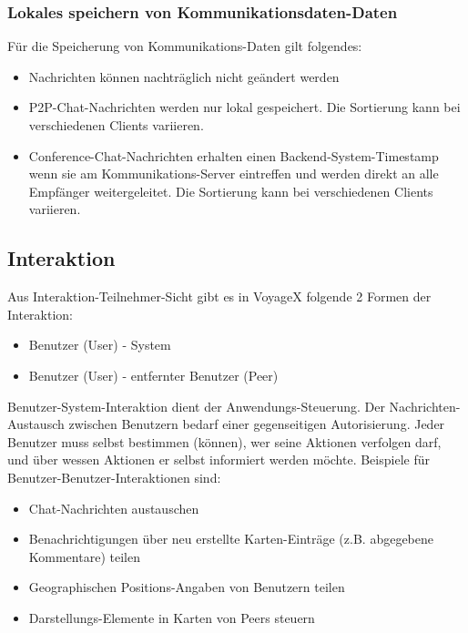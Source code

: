 \subsubsection{Lokales speichern von Kommunikationsdaten-Daten}
Für die Speicherung von Kommunikations-Daten gilt folgendes:
\begin{itemize}[leftmargin=*,noitemsep,topsep=1ex,parsep=0pt,partopsep=0pt]
\item Nachrichten können nachträglich nicht geändert werden
\item P2P-Chat-Nachrichten werden nur lokal gespeichert. Die Sortierung kann bei verschiedenen Clients variieren.
\item Conference-Chat-Nachrichten erhalten einen Backend-System-Timestamp wenn sie am Kommunikations-Server eintreffen und werden direkt an alle Empfänger weitergeleitet. Die Sortierung kann bei verschiedenen Clients variieren.
\end{itemize}
 


\subsection{Interaktion}\label{5_INTER}
Aus Interaktion-Teilnehmer-Sicht gibt es in VoyageX folgende 2 Formen der Interaktion:
\begin{itemize}
	\item Benutzer (User) - System
	\item Benutzer (User) - entfernter Benutzer (Peer)
\end{itemize}
Benutzer-System-Interaktion dient der Anwendungs-Steuerung. Der Nachrichten-Austausch zwischen Benutzern bedarf einer gegenseitigen Autorisierung. Jeder Benutzer muss selbst bestimmen (können), wer seine Aktionen verfolgen darf, und über wessen Aktionen er selbst informiert werden möchte. Beispiele für Benutzer-Benutzer-Interaktionen sind:
\begin{itemize}
	\item Chat-Nachrichten austauschen
	\item Benachrichtigungen über neu erstellte Karten-Einträge (z.B. abgegebene Kommentare) teilen
	\item Geographischen Positions-Angaben von Benutzern teilen
	\item Darstellungs-Elemente in Karten von Peers steuern
\end{itemize}

